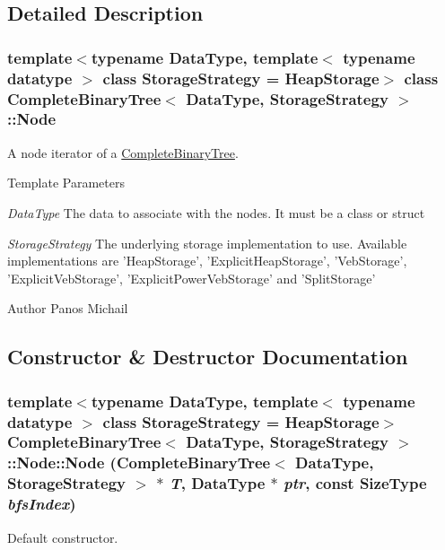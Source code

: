 \subsection{Detailed Description}
\subsubsection*{template$<$typename DataType, template$<$ typename datatype $>$ class StorageStrategy = HeapStorage$>$ class CompleteBinaryTree$<$ DataType, StorageStrategy $>$::Node}

A node iterator of a \hyperlink{class_complete_binary_tree}{CompleteBinaryTree}. 
\begin{DoxyTemplParams}{Template Parameters}
\item[{\em DataType}]The data to associate with the nodes. It must be a class or struct \item[{\em StorageStrategy}]The underlying storage implementation to use. Available implementations are 'HeapStorage', 'ExplicitHeapStorage', 'VebStorage', 'ExplicitVebStorage', 'ExplicitPowerVebStorage' and 'SplitStorage' \end{DoxyTemplParams}
\begin{DoxyAuthor}{Author}
Panos Michail 
\end{DoxyAuthor}


\subsection{Constructor \& Destructor Documentation}
\hypertarget{class_complete_binary_tree_1_1_node_ac4466e71737c92edd77d5fd27155ce8a}{
\subsubsection[{Node}]{\setlength{\rightskip}{0pt plus 5cm}template$<$typename DataType, template$<$ typename datatype $>$ class StorageStrategy = HeapStorage$>$ {\bf CompleteBinaryTree}$<$ DataType, StorageStrategy $>$::Node::Node ({\bf CompleteBinaryTree}$<$ DataType, StorageStrategy $>$ $\ast$ {\em T}, \/  DataType $\ast$ {\em ptr}, \/  const SizeType {\em bfsIndex})}}
\label{class_complete_binary_tree_1_1_node_ac4466e71737c92edd77d5fd27155ce8a}


Default constructor. 


